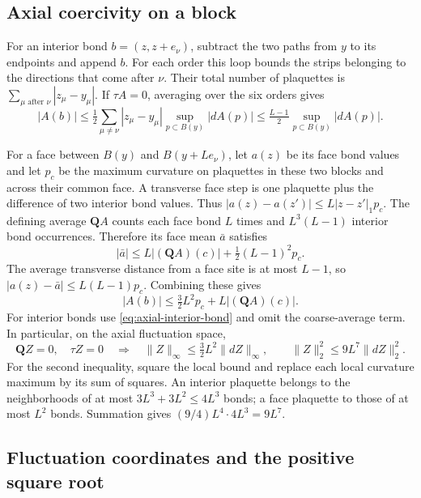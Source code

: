 \subsection{Axial coercivity on a block}\label{subsec:photon-axial-coercivity}

For an interior bond $b=(z,z+e_\nu)$, subtract the two
paths from $y$ to its endpoints and append $b$. For each order this
loop bounds the strips belonging to the directions that come after
$\nu$. Their total number of plaquettes is
$\sum_{\mu\text{ after }\nu}|z_\mu-y_\mu|$. If $\tau A=0$,
averaging over the six orders gives
\begin{equation}\label{eq:axial-interior-bond}
 |A(b)|\le\tfrac12\sum_{\mu\ne\nu}|z_\mu-y_\mu|
           \sup_{p\subset B(y)}|dA(p)|
       \le\tfrac{L-1}{2}\sup_{p\subset B(y)}|dA(p)|.
\end{equation}

For a face between $B(y)$ and $B(y+Le_\nu)$, let $a(z)$ be its face
bond values and let $p_c$ be the maximum curvature on plaquettes in
these two blocks and across their common face. A transverse face step
is one plaquette plus the difference of two interior bond values.
Thus $|a(z)-a(z')|\le L|z-z'|_1p_c$.
The defining average $\mathbf QA$ counts each face bond $L$ times
and $L^3(L-1)$ interior bond occurrences. Therefore its face mean
$\bar a$ satisfies
\[
 |\bar a|\le L|(\mathbf QA)(c)|
                       +\tfrac12(L-1)^2p_c.
\]
The average transverse distance from a face site is at most $L-1$,
so $|a(z)-\bar a|\le L(L-1)p_c$. Combining these gives
\begin{equation}\label{eq:axial-local-bond-bound}
 |A(b)|\le\tfrac32L^2p_c+L|(\mathbf QA)(c)|.
\end{equation}
For interior bonds use \eqref{eq:axial-interior-bond} and omit the
coarse-average term. In particular, on the axial fluctuation space,
\begin{equation}\label{eq:axial-fluctuation-coercivity}
 \mathbf QZ=0,\quad\tau Z=0
     \quad\Longrightarrow\quad
 \|Z\|_\infty\le\tfrac32L^2\|dZ\|_\infty,\qquad
 \|Z\|_2^2\le9L^7\|dZ\|_2^2.
\end{equation}
For the second inequality, square the local bound and replace each
local curvature maximum by its sum of squares. An interior plaquette
belongs to the neighborhoods of at most $3L^3+3L^2\le4L^3$ bonds;
a face plaquette to those of at most $L^2$ bonds. Summation gives
$(9/4)L^4\cdot4L^3=9L^7$.

\subsection{Fluctuation coordinates and the positive square root}
\label{subsec:photon-fluctuation-root}

